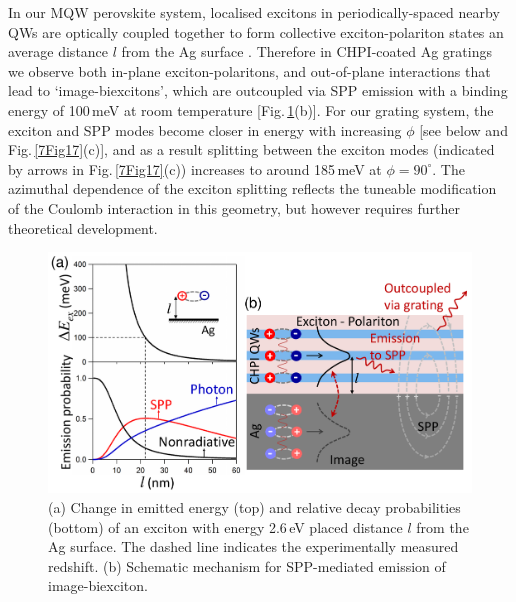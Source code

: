In our MQW perovskite system, localised excitons in periodically-spaced nearby QWs are optically coupled together to form collective exciton-polariton states an average distance $l$ from the Ag surface \cite{Pbbr2008, Baumberg1998, Kavokin1998, Vladimirova1998}. Therefore in CHPI-coated Ag gratings we observe both in-plane exciton-polaritons, and out-of-plane interactions that lead to `image-biexcitons', which are outcoupled via SPP emission with a binding energy of 100\,meV at room temperature [Fig.\,\ref{7Fig16}(b)]. For our grating system, the exciton and SPP modes become closer in energy with increasing $\phi$ [see below and Fig.\,\ref{7Fig17}(c)], and as a result splitting between the exciton modes (indicated by arrows in Fig.\,\ref{7Fig17}(c)) increases to around 185\,meV at $\phi=90^{\circ}$. The azimuthal dependence of the exciton splitting reflects the tuneable modification of the Coulomb interaction in this geometry, but however requires further theoretical development.
\begin{figure}[h!] 
\centering    
\includegraphics[width=\textwidth]{Fig16}
\caption{(a) Change in emitted energy (top) and relative decay probabilities (bottom) of an exciton with energy 2.6\,eV placed distance $l$ from the Ag surface. The dashed line indicates the experimentally measured redshift. (b) Schematic mechanism for SPP-mediated emission of image-biexciton.}
\label{7Fig16}
\end{figure}

